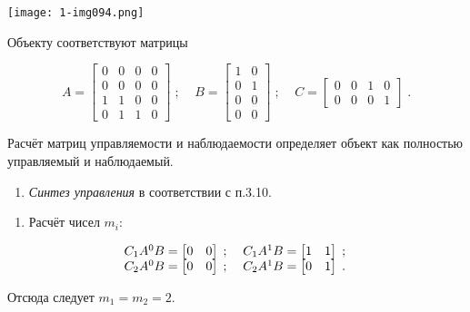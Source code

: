 \documentclass[a4paper]{article}
\newcommand\liststyleWWviiiNumxvi{%
\renewcommand\theenumi{\Roman{enumi}}
\renewcommand\theenumii{\alph{enumii}}
\renewcommand\theenumiii{\roman{enumiii}}
\renewcommand\theenumiv{\arabic{enumiv}}
\renewcommand\labelenumi{\theenumi.}
\renewcommand\labelenumii{\theenumii.}
\renewcommand\labelenumiii{\theenumiii.}
\renewcommand\labelenumiv{\theenumiv.}
}
\newcommand\liststyleWWviiiNumlxxvi{%
\renewcommand\theenumi{\arabic{enumi}}
\renewcommand\theenumii{\alph{enumii}}
\renewcommand\theenumiii{\roman{enumiii}}
\renewcommand\theenumiv{\arabic{enumiv}}
\renewcommand\labelenumi{\theenumi.}
\renewcommand\labelenumii{\theenumii.}
\renewcommand\labelenumiii{\theenumiii.}
\renewcommand\labelenumiv{\theenumiv.}
}
\begin{document}
\bigskip

{\centering  \texttt{[image: 1-img094.png]} \par}
{\begin{russian}\sffamily
Объекту соответствуют матрицы
\end{russian}}

\begin{equation*}
A=\left[\begin{matrix}0&0&0&0\\0&0&0&0\\1&1&0&0\\0&1&1&0\end{matrix}\right]\;;\;\;\;\;B=\left[\begin{matrix}1&0\\0&1\\0&0\\0&0\end{matrix}\right]\;;\;\;\;\;C=\left[\begin{matrix}0&0&1&0\\0&0&0&1\end{matrix}\right]\;.
\end{equation*}
{\begin{russian}\sffamily
Расчёт матриц управляемости и наблюдаемости определяет объект как полностью управляемый и наблюдаемый.
\end{russian}}

\liststyleWWviiiNumxvi
\begin{enumerate}
\item {\begin{russian}\sffamily
\textit{Синтез управления }в соответствии с п.3.10.
\end{russian}}
\end{enumerate}
\liststyleWWviiiNumlxxvi
\begin{enumerate}
\item {\begin{russian}\sffamily
Расчёт чисел  $m_i$:
\end{russian}}
\end{enumerate}
\begin{equation*}
\begin{matrix}C_1A^0B=\left[\begin{matrix}0\hfill\null &0\hfill\null
\end{matrix}\right]\;;\;\;\;\;C_1A^1B=\left[\begin{matrix}1\hfill\null &1\hfill\null \end{matrix}\right]\;;\hfill\null
\\C_2A^0B=\left[\begin{matrix}0\hfill\null &0\hfill\null
\end{matrix}\right]\;;\;\;\;\;C_2A^1B=\left[\begin{matrix}0\hfill\null &1\hfill\null \end{matrix}\right]\;.\hfill\null
\end{matrix}\hfill 
\end{equation*}
{\begin{russian}\sffamily
Отсюда следует  $m_1=m_2=2$.
\end{russian}}
\end{document}
